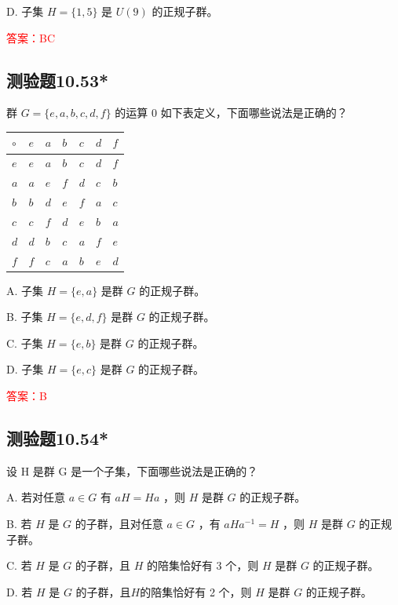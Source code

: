 \documentclass[UTF8, heading=true]{ctexart}
\begin{document}
D. 子集 $H=\{1,5\}$ 是 $U(9)$ 的正规子群。

\textcolor{red}{答案：BC}

\subsection{测验题10.53*}

群 $G=\{e, a, b, c, d, f\}$ 的运算 0 如下表定义，下面哪些说法是正确的？

\begin{table}[H]
  \renewcommand{\arraystretch}{1.5}
  \centering
\begin{tabular}{l|llllll}
\hline$\circ$ & $e$ & $a$ & $b$ & $c$ & $d$ & $f$ \\
\hline$e$ & $e$ & $a$ & $b$ & $c$ & $d$ & $f$ \\
$a$ & $a$ & $e$ & $f$ & $d$ & $c$ & $b$ \\
$b$ & $b$ & $d$ & $e$ & $f$ & $a$ & $c$ \\
$c$ & $c$ & $f$ & $d$ & $e$ & $b$ & $a$ \\
$d$ & $d$ & $b$ & $c$ & $a$ & $f$ & $e$ \\
$f$ & $f$ & $c$ & $a$ & $b$ & $e$ & $d$ \\
\hline
\end{tabular}
\end{table}

A. 子集 $H=\{e, a\}$ 是群 $G$ 的正规子群。

B. 子集 $H=\{e, d, f\}$ 是群 $G$ 的正规子群。

C. 子集 $H=\{e, b\}$ 是群 $G$ 的正规子群。

D. 子集 $H=\{e, c\}$ 是群 $G$ 的正规子群。

\textcolor{red}{答案：B}

\subsection{测验题10.54*}

设 H 是群 G 是一个子集，下面哪些说法是正确的？

A. 若对任意 $a \in G$ 有 $a H=H a$ ，则 $H$ 是群 $G$ 的正规子群。

B. 若 $H$ 是 $G$ 的子群，且对任意 $a \in G$ ，有 $a H a^{-1}=H$ ，则 $H$ 是群 $G$ 的正规子群。

C. 若 $H$ 是 $G$ 的子群，且 $H$ 的陪集恰好有 3 个，则 $H$ 是群 $G$ 的正规子群。

D. 若 $H$ 是 $G$ 的子群，且$H$的陪集恰好有 2 个，则 $H$ 是群 $G$ 的正规子群。
\end{document}
